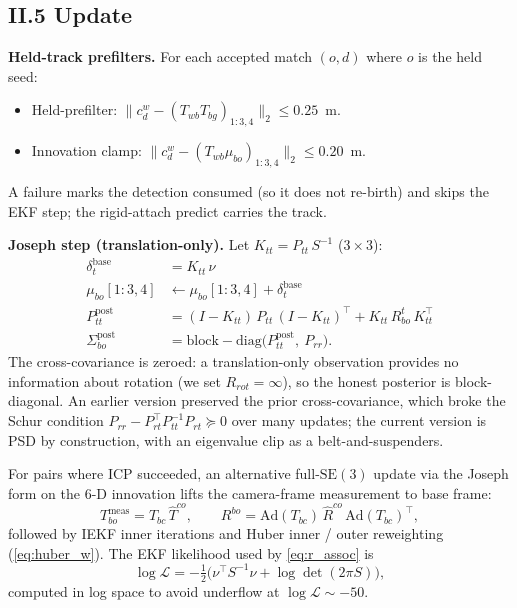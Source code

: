 \documentclass[11pt]{article}
\newcommand{\SE}{\mathrm{SE}(3)}
\newcommand{\Ad}{\mathrm{Ad}}
\begin{document}
\subsection*{II.5 Update}

\textbf{Held-track prefilters.} For each accepted match $(o,d)$ where $o$ is
the held seed:
\begin{itemize}[leftmargin=1.5em,itemsep=0pt,topsep=2pt]
\item Held-prefilter: $\|c_d^w - (T_{wb}T_{bg})_{1:3,4}\|_2 \le 0.25$~m.
\item Innovation clamp: $\|c_d^w - (T_{wb}\mu_{bo})_{1:3,4}\|_2 \le 0.20$~m.
\end{itemize}
A failure marks the detection consumed (so it does not re-birth) and skips
the EKF step; the rigid-attach predict carries the track.

\textbf{Joseph step (translation-only).} Let $K_{tt} = P_{tt}\,S^{-1}$
($3\times 3$):
\begin{align*}
  \delta_t^{\text{base}} &= K_{tt}\,\nu \\
  \mu_{bo}[1{:}3, 4] &\leftarrow \mu_{bo}[1{:}3, 4] + \delta_t^{\text{base}} \\
  P_{tt}^{\text{post}} &= (I - K_{tt})\,P_{tt}\,(I - K_{tt})^\top + K_{tt}\,R_{bo}^t\,K_{tt}^\top \\
  \Sigma_{bo}^{\text{post}} &= \mathrm{block\!-\!diag}\bigl(P_{tt}^{\text{post}},\ P_{rr}\bigr).
\end{align*}
The cross-covariance is zeroed: a translation-only observation provides no
information about rotation (we set $R_{rot}=\infty$), so the honest
posterior is block-diagonal. An earlier version preserved the prior
cross-covariance, which broke the Schur condition
$P_{rr}-P_{rt}^\top P_{tt}^{-1}P_{rt}\succeq 0$ over many updates; the
current version is PSD by construction, with an eigenvalue clip as a
belt-and-suspenders.

For pairs where ICP succeeded, an alternative full-$\SE$ update via the
Joseph form on the $6$-D innovation lifts the camera-frame measurement to
base frame:
\begin{equation}\label{eq:meas_compose}
T_{bo}^{\text{meas}} = T_{bc}\,\hat T^{co}, \qquad
R^{bo} = \Ad(T_{bc})\,\hat R^{co}\,\Ad(T_{bc})^\top,
\end{equation}
followed by IEKF inner iterations and Huber inner / outer reweighting
(\eqref{eq:huber_w}). The EKF likelihood used by \eqref{eq:r_assoc} is
\begin{equation}\label{eq:ekf_lik}
\log\mathcal L = -\tfrac{1}{2}\bigl(\nu^\top S^{-1}\nu + \log\det(2\pi S)\bigr),
\end{equation}
computed in log space to avoid underflow at $\log\mathcal L\sim -50$.
\end{document}
